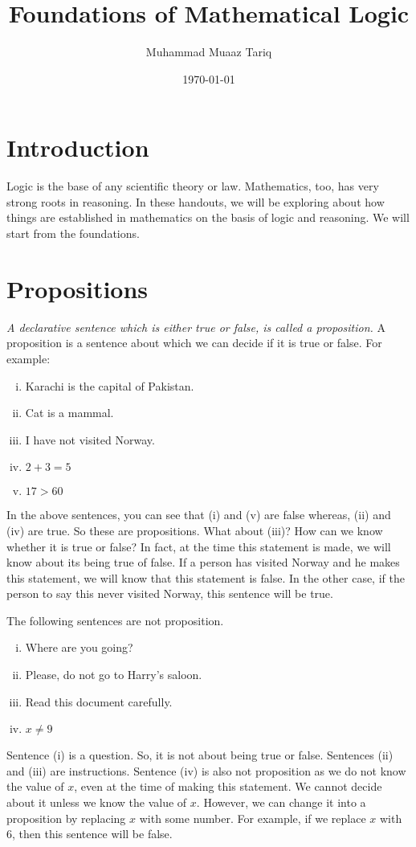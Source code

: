 \documentclass[a4paper]{article}
\title{Foundations of Mathematical Logic}
\author{Muhammad Muaaz Tariq}
\date{\today}
\theoremstyle{definition}
\theoremstyle{definition}
\theoremstyle{definition}
\theoremstyle{definition}
\theoremstyle{definition}
\theoremstyle{definition}
\theoremstyle{definition}
\begin{document}
\maketitle

\section*{Introduction}
Logic is the base of any scientific theory or law. Mathematics, too, has very strong roots in reasoning. In these handouts, we will be exploring about how things are established in mathematics on the basis of logic and reasoning. We will start from the foundations.
 
\section{Propositions}
\textit{A declarative sentence which is either true or false, is called a proposition.} A proposition is a sentence about which we can decide if it is true or false. For example:
\begin{enumerate}[i.]
    \item Karachi is the capital of Pakistan.
    \item Cat is a mammal.
    \item I have not visited Norway.
    \item $2 + 3 = 5$
    \item $ 17 > 60$
\end{enumerate}
In the above sentences, you can see that (i) and (v) are false whereas, (ii) and (iv) are true. So these are propositions. What about (iii)? How can we know whether it is true or false? In fact, at the time this statement is made, we will know about its being true of false. If a person has visited Norway and he makes this statement, we will know that this statement is false. In the other case, if the person to say this never visited Norway, this sentence will be true.


The following sentences are not proposition.
\begin{enumerate}[i.]
    \item Where are you going?
    \item Please, do not go to Harry's saloon.
    \item Read this document carefully.
    \item $x \neq 9$
\end{enumerate}
Sentence (i) is a question. So, it is not about being true or false. Sentences (ii) and (iii) are instructions. Sentence (iv) is also not proposition as we do not know the value of $x$, even at the time of making this statement. We cannot decide about it unless we know the value of $x$. However, we can change it into a proposition by replacing $x$ with some number. For example, if we replace $x$ with 6, then this sentence will be false.
\end{document}
